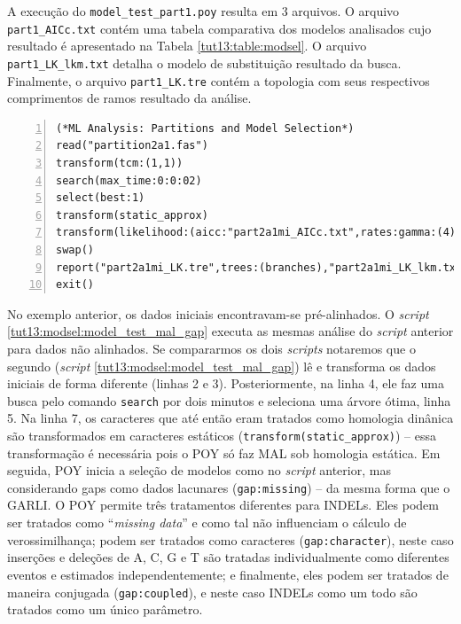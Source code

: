 \begin{refsection}
A execução do \texttt{model\_test\_part1.poy} resulta em 3 arquivos. O arquivo \texttt{part1\_AICc.txt} contém uma tabela comparativa dos modelos analisados cujo resultado é apresentado na Tabela \ref{tut13:table:modsel}. O arquivo \texttt{part1\_LK\_lkm.txt} detalha o modelo de substituição resultado da busca. Finalmente, o arquivo \texttt{part1\_LK.tre} contém a topologia com seus respectivos comprimentos de ramos resultado da análise.

\scriptsize
\begin{lstlisting}[caption={\texttt{model\_test\_part2a1mi.poy}.},label=tut13:modsel:model_test_mal_gap, numbers=left, numberblanklines=false]
(*ML Analysis: Partitions and Model Selection*)
read("partition2a1.fas")
transform(tcm:(1,1))
search(max_time:0:0:02)
select(best:1)
transform(static_approx)
transform(likelihood:(aicc:"part2a1mi_AICc.txt",rates:gamma:(4), priors:estimate, gap:missing, mal))
swap()
report("part2a1mi_LK.tre",trees:(branches),"part2a1mi_LK_lkm.txt",lkmodel)
exit()
\end{lstlisting}
\normalsize

No exemplo anterior, os dados iniciais encontravam-se pré-alinhados. O \textit{script} \ref{tut13:modsel:model_test_mal_gap} executa as mesmas análise do \textit{script} anterior para dados não alinhados. Se compararmos os dois \textit{scripts} notaremos que o segundo (\textit{script} \ref{tut13:modsel:model_test_mal_gap}) lê e transforma os dados iniciais de forma diferente (linhas 2 e 3). Posteriormente, na linha 4, ele faz uma busca pelo comando \texttt{search} por dois minutos e seleciona uma árvore ótima, linha 5. Na linha 7, os caracteres que até então eram tratados como homologia dinânica são transformados em caracteres estáticos (\texttt{transform(static\_approx)}) -- essa transformação é necessária pois o POY só faz MAL sob homologia estática. Em seguida, POY inicia a seleção de modelos como no \textit{script} anterior, mas considerando gaps como dados lacunares (\texttt{gap:missing}) -- da mesma forma que o GARLI. O POY permite três tratamentos diferentes para INDELs. Eles podem ser tratados como ``\textit{missing data}'' e como tal não influenciam o cálculo de verossimilhança; podem ser tratados como caracteres (\texttt{gap:character}), neste caso inserções e deleções de A, C, G e T são tratadas individualmente como diferentes eventos e estimados independentemente; e finalmente, eles podem ser tratados de maneira conjugada (\texttt{gap:coupled}), e neste caso INDELs como um todo são tratados como um único parâmetro.\\



\end{refsection}
